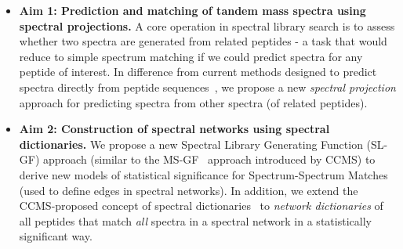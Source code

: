 \documentclass[arial,11pt]{article}
\begin{document}
\begin{itemize}
    \item {\bf Aim 1: Prediction and matching of tandem mass spectra using spectral projections.} A core operation in spectral library search is to assess whether two spectra are generated from related peptides \-- a task that would reduce to simple spectrum matching if we could predict spectra for any peptide of interest. In difference from current methods designed to predict spectra directly from peptide sequences~\cite{paizs05,zhang05,zhang10}, we propose a new {\em spectral projection} approach for predicting spectra from other spectra (of related peptides).

    \item {\bf Aim 2: Construction of spectral networks using spectral dictionaries.} We propose a new Spectral Library Generating Function (SL-GF) approach (similar to the MS-GF~\cite{kim08} approach introduced by CCMS) to derive new models of statistical significance for Spectrum-Spectrum Matches (used to define edges in spectral networks). In addition, we extend the CCMS-proposed concept of spectral dictionaries~\cite{kim09msdict,jeong11} to {\em network dictionaries} of all peptides that match {\em all} spectra in a spectral network in a statistically significant way.


\end{itemize}
\end{document}
